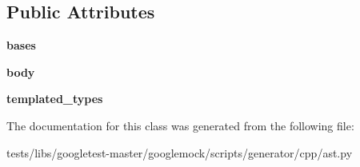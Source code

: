 \subsection*{Public Attributes}
\begin{DoxyCompactItemize}
\item 
\mbox{\label{classtests_1_1libs_1_1googletest-master_1_1googlemock_1_1scripts_1_1generator_1_1cpp_1_1ast_1_1Class_ad24dd7245687556c6a556cd42e681c35}} 
{\bfseries bases}
\item 
\mbox{\label{classtests_1_1libs_1_1googletest-master_1_1googlemock_1_1scripts_1_1generator_1_1cpp_1_1ast_1_1Class_ab6d93de9bd44d56c6f2f13d643f4bdf5}} 
{\bfseries body}
\item 
\mbox{\label{classtests_1_1libs_1_1googletest-master_1_1googlemock_1_1scripts_1_1generator_1_1cpp_1_1ast_1_1Class_ac5e2a7f04c5b9f92af06f5ab0ac0906b}} 
{\bfseries templated\+\_\+types}
\end{DoxyCompactItemize}


The documentation for this class was generated from the following file\+:\begin{DoxyCompactItemize}
\item 
tests/libs/googletest-\/master/googlemock/scripts/generator/cpp/ast.\+py\end{DoxyCompactItemize}
